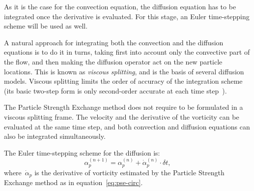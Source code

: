 As it is the case for the convection equation,
the diffusion equation has to be integrated
once the derivative is evaluated.
For this stage,
an Euler time-stepping scheme will be used as well.

A natural approach for integrating both the convection and the diffusion equations
is to do it in turns, taking first into account only the convective part of the flow,
and then making the diffusion operator act on the new particle locations.
This is known as \emph{viscous splitting},
and is the basis of several diffusion models.
Viscous splitting limits the order of accuracy of the integration scheme
(its basic two-step form is only second-order accurate
at each time step~\cite[\S2.1.1]{barba04}).

The Particle Strength Exchange method
does not require to be formulated
in a viscous splitting frame.
The velocity and the derivative of the vorticity
can be evaluated at the same time step,
and both convection and diffusion equations
can also be integrated simultaneously.

The Euler time-stepping scheme for the diffusion is:
\begin{equation}
  \label{eq:euler-diffusion}
  α_p^{(n + 1)} = α_p^{(n)} + \dot{α}_p^{(n)}\cdot δt,
\end{equation}
where~\(\dot{α}_p\) is the derivative of vorticity
estimated by the Particle Strength Exchange method
as in equation~\eqref{eq:pse-circ}.

